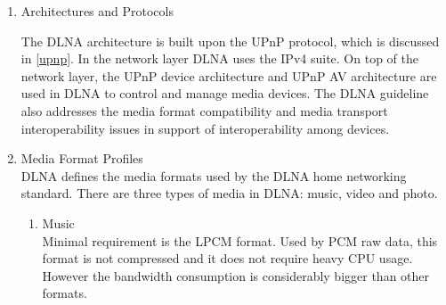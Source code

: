 \begin{enumerate} 
\item Architectures and Protocols 

\begin{table}[htb] 
\caption{Key Technology Ingredients \label{Table3}} 
\begin{center} 
\end{center} 
\end{table} 

The DLNA architecture is built upon the UPnP protocol, which is discussed in \ref{upnp}. 
In the network layer DLNA uses the IPv4 suite. On top of the network layer, the UPnP device architecture and UPnP AV architecture are used in DLNA to control and manage media devices. The DLNA 
guideline also addresses the media format compatibility and media transport 
interoperability issues in support of interoperability among devices. 

\item Media Format Profiles \\ 
DLNA defines the media formats used by the DLNA home networking 
standard. There are three types of media in DLNA: music, video and photo. 
\begin{enumerate} 
\item Music \\ 
Minimal requirement is the LPCM format. Used by PCM raw data, this format is not compressed and it does not require heavy CPU usage. However the bandwidth consumption is 
considerably bigger than other formats. 


\end{enumerate}
\end{enumerate}
